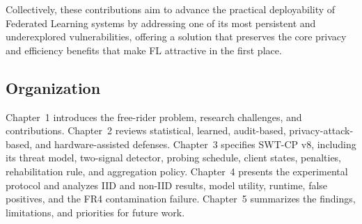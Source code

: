 Collectively, these contributions aim to advance the practical deployability of Federated Learning systems by addressing one of its most persistent and underexplored vulnerabilities, offering a solution that preserves the core privacy and efficiency benefits that make FL attractive in the first place.


\subsection{Organization}
Chapter~1 introduces the free-rider problem, research challenges, and contributions. Chapter~2 reviews statistical, learned, audit-based, privacy-attack-based, and hardware-assisted defenses. Chapter~3 specifies SWT-CP v8, including its threat model, two-signal detector, probing schedule, client states, penalties, rehabilitation rule, and aggregation policy. Chapter~4 presents the experimental protocol and analyzes IID and non-IID results, model utility, runtime, false positives, and the FR4 contamination failure. Chapter~5 summarizes the findings, limitations, and priorities for future work.
